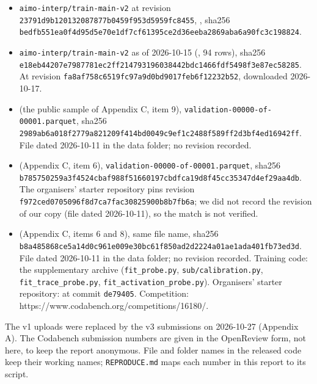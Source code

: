 \documentclass{article}
\providecommand{\tightlist}{\setlength{\itemsep}{0pt}\setlength{\parskip}{0pt}}
\begin{document}
\begin{itemize}
\tightlist
\item
  \texttt{aimo-interp/train-main-v2} at revision \texttt{23791d9b120132087877\allowbreak{}b0459f953d5959fc8455},
  , sha256 \texttt{bedfb551ea0f4d95d5e70e1df7cf6139\allowbreak{}5ce2d36eeba2869aba6a90fc3c198824}.
\item
  \texttt{aimo-interp/train-main-v2} as of 2026-10-15 (, 94
  rows), sha256 \texttt{e18eb44207e7987781ec2ff214793196\allowbreak{}038442bdc1466fdf5498f3e87ec58285}. At revision
\texttt{fa8af758c6519fc97a9d\allowbreak{}0bd9017feb6f12232b52}, downloaded 2026-10-17.
\item
   (the public sample of Appendix C, item 9),
  \texttt{validation-00000-of-00001.parquet}, sha256 \texttt{2989ab6a018f2779a821209f414bd004\allowbreak{}9c9ef1c2488f589ff2d3bf4ed16942ff}.
  File dated 2026-10-11 in the data folder; no revision recorded.
\item
   (Appendix C, item 6), \texttt{validation-00000-of-00001.parquet}, sha256
  \texttt{b785750259a3f4524cbaf988f5166019\allowbreak{}7cbdfca19d8f45cc35347d4ef29aa4db}. The organisers' starter repository pins
  revision \texttt{f972ced0705096f8d7ca\allowbreak{}7fac30825900b8b7fb6a}; we did not record the revision of our
  copy (file dated 2026-10-11), so the match is not verified.
\item
   (Appendix C, items 6 and 8), same file name, sha256
  \texttt{b8a485868ce5a14d0c961e009e30bc61\allowbreak{}f850ad2d2224a01ae1ada401fb73ed3d}. File dated 2026-10-11 in
  the data folder; no revision recorded.
  Training
  code: the supplementary archive (\texttt{fit\_probe.py}, \texttt{sub/calibration.py}, \texttt{fit\_trace\_probe.py},
  \texttt{fit\_activation\_probe.py}). Organisers' starter repository:  at commit
  \texttt{de79405}. Competition: https://www.codabench.org/competitions/16180/.
\end{itemize}

The v1 uploads were replaced by the v3 submissions on 2026-10-27 (Appendix A). The Codabench submission numbers are given in the OpenReview form, not here, to keep the report anonymous. File and folder names in the released code keep their working names; \texttt{REPRODUCE.md} maps each number in this report to its script.
\end{document}
